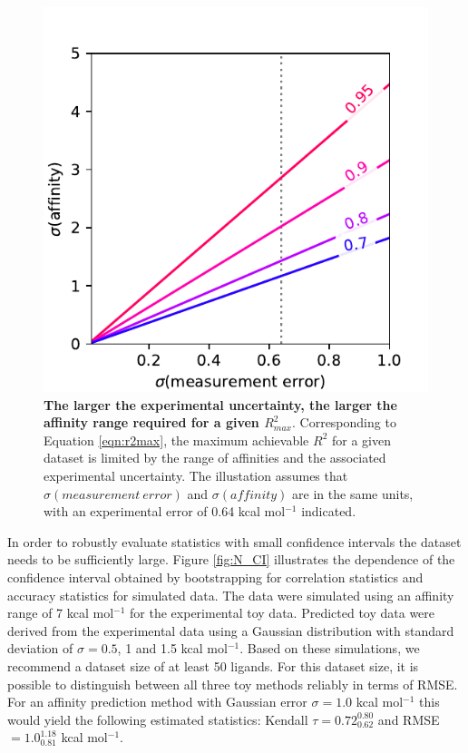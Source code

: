 \documentclass[9pt,bestpractices]{livecoms}
\begin{document}
\begin{figure}
    \includegraphics[width=0.95\linewidth]{figures/R2max.pdf}
    \caption{\textbf{The larger the experimental uncertainty, the larger the affinity range required for a given $R^2_{max}$}. Corresponding to Equation \ref{eqn:r2max}, the maximum achievable $R^2$ for a given dataset is limited by the range of affinities and the associated experimental uncertainty. The illustation assumes that $\sigma(measurement\ error)$ and $\sigma(affinity)$ are in the same units, with an experimental error of 0.64 kcal mol$^{-1}$ indicated.}
    \label{fig:map}
\end{figure}

In order to robustly evaluate statistics with small confidence intervals the dataset needs to be sufficiently large. Figure \ref{fig:N_CI} illustrates the dependence of the confidence interval obtained by bootstrapping for correlation statistics and accuracy statistics for simulated data. The data were simulated using an affinity range of 7 kcal mol$^{-1}$ for the experimental toy data. Predicted toy data were derived from the experimental data using a Gaussian distribution with standard deviation of $\sigma = 0.5$, 1 and 1.5 kcal mol$^{-1}$. Based on these simulations, we recommend a dataset size of at least 50 ligands. For this dataset size, it is possible to distinguish between all three toy methods reliably in terms of RMSE. For an affinity prediction method with Gaussian error $\sigma = 1.0$ kcal mol$^{-1}$ this would yield the following estimated statistics: Kendall $\tau = 0.72_{0.62}^{0.80}$ and RMSE $= 1.0_{0.81}^{1.18}$ kcal mol$^{-1}$.
\end{document}
